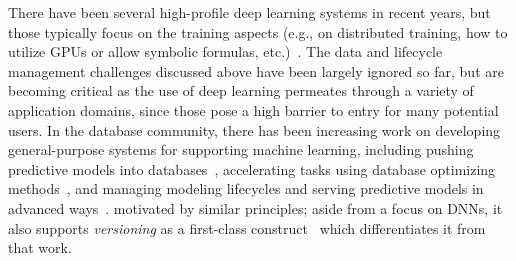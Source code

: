\documentclass[conference]{IEEEtran}
\begin{document}
There have been several high-profile deep learning systems in recent years, but those typically focus on the training aspects (e.g., on distributed training, how to utilize GPUs or allow symbolic formulas, etc.)~\cite{caffe2014mm,tensorflow,distbelief2012nips,adam14osdi,singa2015mm}. %
The data and lifecycle management challenges discussed above have been largely ignored so far, but are becoming critical as the use of deep learning permeates through a variety of application domains, since those pose a high barrier to entry for many potential users.
In the database community, there has been increasing work on developing general-purpose systems for supporting machine learning, including pushing predictive models into databases~\cite{brown11cidr,madlib2012sigmod},
   accelerating tasks using database optimizing methods~\cite{ce2014sigmod,arun2015sigmod}, %
and managing modeling lifecycles and serving predictive models in advanced ways~\cite{madden15learningsys,franklin2015learningsys}.  %
\modelhub\is motivated by similar principles; aside from a focus on DNNs, it also supports {\em versioning} as a first-class construct~\cite{datahub} which differentiates it from that work.
\end{document}
